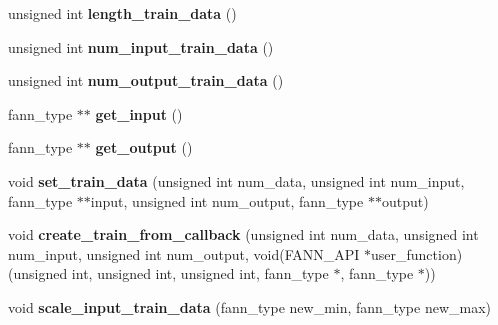 \begin{DoxyCompactItemize}
\item 
\hypertarget{class_f_a_n_n_1_1training__data_ad54ac58bc9244d6501f71fb2d853693c}{unsigned int {\bfseries length\-\_\-train\-\_\-data} ()}\label{class_f_a_n_n_1_1training__data_ad54ac58bc9244d6501f71fb2d853693c}

\item 
\hypertarget{class_f_a_n_n_1_1training__data_a2b8522672432e062d9718deffb8938cb}{unsigned int {\bfseries num\-\_\-input\-\_\-train\-\_\-data} ()}\label{class_f_a_n_n_1_1training__data_a2b8522672432e062d9718deffb8938cb}

\item 
\hypertarget{class_f_a_n_n_1_1training__data_a3843b1b57f493c464cf08bc38cd469af}{unsigned int {\bfseries num\-\_\-output\-\_\-train\-\_\-data} ()}\label{class_f_a_n_n_1_1training__data_a3843b1b57f493c464cf08bc38cd469af}

\item 
\hypertarget{class_f_a_n_n_1_1training__data_aff2d8bf7d99a5ae1305a3aef5eb567af}{fann\-\_\-type $\ast$$\ast$ {\bfseries get\-\_\-input} ()}\label{class_f_a_n_n_1_1training__data_aff2d8bf7d99a5ae1305a3aef5eb567af}

\item 
\hypertarget{class_f_a_n_n_1_1training__data_adb2e824d725a266ad6090600fc062234}{fann\-\_\-type $\ast$$\ast$ {\bfseries get\-\_\-output} ()}\label{class_f_a_n_n_1_1training__data_adb2e824d725a266ad6090600fc062234}

\item 
\hypertarget{class_f_a_n_n_1_1training__data_ac9210b8eba42ae344117c913cdfe71e5}{void {\bfseries set\-\_\-train\-\_\-data} (unsigned int num\-\_\-data, unsigned int num\-\_\-input, fann\-\_\-type $\ast$$\ast$input, unsigned int num\-\_\-output, fann\-\_\-type $\ast$$\ast$output)}\label{class_f_a_n_n_1_1training__data_ac9210b8eba42ae344117c913cdfe71e5}

\item 
\hypertarget{class_f_a_n_n_1_1training__data_afbe63778b21e18a574f8942791ad372d}{void {\bfseries create\-\_\-train\-\_\-from\-\_\-callback} (unsigned int num\-\_\-data, unsigned int num\-\_\-input, unsigned int num\-\_\-output, void(F\-A\-N\-N\-\_\-\-A\-P\-I $\ast$user\-\_\-function)(unsigned int, unsigned int, unsigned int, fann\-\_\-type $\ast$, fann\-\_\-type $\ast$))}\label{class_f_a_n_n_1_1training__data_afbe63778b21e18a574f8942791ad372d}

\item 
\hypertarget{class_f_a_n_n_1_1training__data_a998ef800bfe95f77021486036112e87d}{void {\bfseries scale\-\_\-input\-\_\-train\-\_\-data} (fann\-\_\-type new\-\_\-min, fann\-\_\-type new\-\_\-max)}\label{class_f_a_n_n_1_1training__data_a998ef800bfe95f77021486036112e87d}


\end{DoxyCompactItemize}
